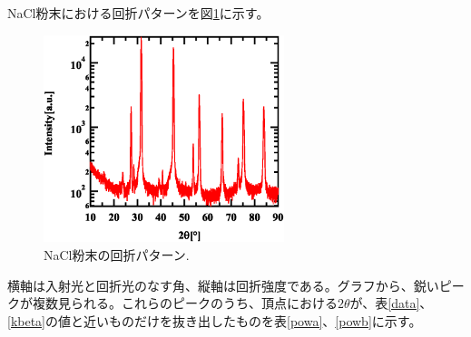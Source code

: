 \documentclass[11pt,a4j,uplatex]{jsarticle}
\begin{document}
NaCl粉末における回折パターンを図\ref{powder}に示す。

\begin{figure}[htb]
 \centering
 \includegraphics[clip,width=7cm]{FigPowder.eps}
 \caption{NaCl粉末の回折パターン.}
 \label{powder}
\end{figure}

横軸は入射光と回折光のなす角、縦軸は回折強度である。グラフから、鋭いピークが複数見られる。これらのピークのうち、頂点における$2\theta$が、表\ref{data}、\ref{kbeta}の値と近いものだけを抜き出したものを表\ref{powa}、\ref{powb}に示す。
\end{document}
